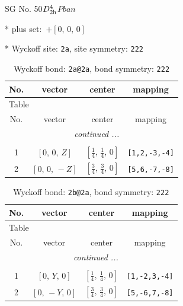 \documentclass[fleqn,8pt]{jsarticle}
\begin{document}
\setcounter{MaxMatrixCols}{32}

\renewcommand{\tablename}{Table~}
\renewcommand{\figurename}{Figure~}
\begin{center}
\LARGE
SG No. 50\quad$D_{\rm 2h}^{4}$\quad$Pban$\quad[ orthorhombic ]
\end{center}

* plus set:\,\,\,$+\left[ 0,\, 0,\, 0 \right]$


* Wyckoff site: {\tt 2a}, site symmetry: {\tt 222}
\renewcommand{\arraystretch}{1.2}
\begin{longtable}{cccc}
\caption{Wyckoff bond: {\tt 2a@2a}, bond symmetry: {\tt 222}}
 \\
 \hline \hline
No. & vector & center & mapping \\ \hline \endfirsthead

\multicolumn{3}{l}{\tablename\ \thetable{}} \\
 \hline \hline
No. & vector & center & mapping \\ \hline \endhead

 \hline \hline
\multicolumn{3}{r}{\footnotesize\it continued ...} \\ \endfoot

 \hline \hline
\multicolumn{3}{r}{} \\ \endlastfoot

1 & $\left[ 0,\, 0,\, Z \right]$ & $\left[ \frac{1}{4},\, \frac{1}{4},\, 0 \right]$ & {\tt [1,2,-3,-4]} \\ \hline
2 & $\left[ 0,\, 0,\, - Z \right]$ & $\left[ \frac{3}{4},\, \frac{3}{4},\, 0 \right]$ & {\tt [5,6,-7,-8]} \\
\end{longtable}
\renewcommand{\arraystretch}{1.2}
\begin{longtable}{cccc}
\caption{Wyckoff bond: {\tt 2b@2a}, bond symmetry: {\tt 222}}
 \\
 \hline \hline
No. & vector & center & mapping \\ \hline \endfirsthead

\multicolumn{3}{l}{\tablename\ \thetable{}} \\
 \hline \hline
No. & vector & center & mapping \\ \hline \endhead

 \hline \hline
\multicolumn{3}{r}{\footnotesize\it continued ...} \\ \endfoot

 \hline \hline
\multicolumn{3}{r}{} \\ \endlastfoot

1 & $\left[ 0,\, Y,\, 0 \right]$ & $\left[ \frac{1}{4},\, \frac{1}{4},\, 0 \right]$ & {\tt [1,-2,3,-4]} \\ \hline
2 & $\left[ 0,\, - Y,\, 0 \right]$ & $\left[ \frac{3}{4},\, \frac{3}{4},\, 0 \right]$ & {\tt [5,-6,7,-8]} \\
\end{longtable}
\end{document}
